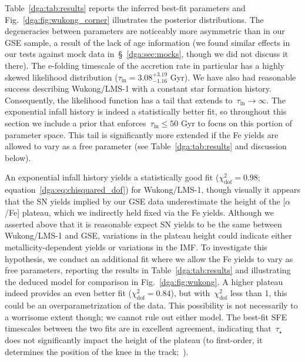 Table~\ref{dga:tab:results} reports the inferred best-fit parameters and
Fig.~\ref{dga:fig:wukong_corner} illustrates the posterior distributions.
The degeneracies between parameters are noticeably more asymmetric than in our
GSE sample, a result of the lack of age information (we found similar effects
in our tests against mock data in~\S~\ref{dga:sec:mocks}, though we did not discuss
it there).
The e-folding timescale of the accretion rate in particular has a highly skewed
likelihood distribution ($\tau_\text{in} = 3.08^{+3.19}_{-1.16}$ Gyr).
We have also had reasonable success describing Wukong/LMS-1 with a constant
star formation history.
Consequently, the likelihood function has a tail that extends
to~$\tau_\text{in} \rightarrow \infty$.
The exponential infall history is indeed a statistically better fit, so
throughout this section we include a prior that
enforces~$\tau_\text{in} \leq 50$ Gyr to focus on this portion of parameter
space.
This tail is significantly more extended if the Fe yields are allowed to vary
as a free parameter (see Table~\ref{dga:tab:results} and discussion below).
\par
An exponential infall history yields a statistically good fit
($\chi_\text{dof}^2 = 0.98$; equation~\ref{dga:eq:chisquared_dof}) for Wukong/LMS-1,
though visually it appears that the SN yields implied by our GSE data
underestimate the height of the [$\alpha$/Fe] plateau, which we indirectly
held fixed via the Fe yields.
Although we asserted above that it is reasonable expect SN yields to be the
same between Wukong/LMS-1 and GSE, variations in the plateau height could
indicate either metallicity-dependent yields or variations in the IMF.
To investigate this hypothesis, we conduct an additional fit where we allow
the Fe yields to vary as free parameters, reporting the results in
Table~\ref{dga:tab:results} and illustrating the deduced model for comparison in
Fig.~\ref{dga:fig:wukong}.
A higher plateau indeed provides an even better fit
($\chi_\text{dof}^2 = 0.84$), but with~$\chi_\text{dof}^2$ less than 1, this
could be an overparametrization of the data.
This possibility is not necessarily to a worrisome extent though; we cannot
rule out either model.
The best-fit SFE timescales between the two fits are in excellent agreement,
indicating that~$\tau_\star$ does not significantly impact the height of the
plateau (to first-order, it determines the position of the knee in the
track;~\citealp{Weinberg2017b}).

